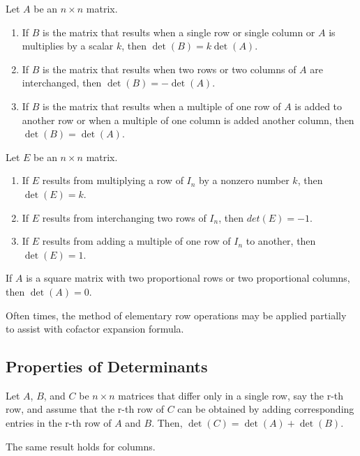 \documentclass{report}
\begin{document}
				\begin{thm}\label{thm_row_ops_det}
					Let $A$ be an $n \times n$ matrix.
					\begin{enumerate}
						\item If $B$ is the matrix that results when a single row or single column or $A$ is multiplies by a scalar $k$, then $\det(B)=k\det(A)$.
						\item If $B$ is the matrix that results when two rows or two columns of $A$ are interchanged, then $\det(B)=-\det(A)$.
						\item If $B$ is the matrix that results when a multiple of one row of $A$ is added to another row or when a multiple of one column is added another column, then $\det(B)=\det(A)$.
					\end{enumerate}
				\end{thm}
				
				\begin{coro}
					Let $E$ be an $n \times n$ matrix.
					\begin{enumerate}
						\item If $E$ results from multiplying a row of $I_n$ by a nonzero number $k$, then $\det(E)=k$.
						\item If $E$ results from interchanging two rows of $I_n$, then $det(E)=-1$.
						\item If $E$ results from adding a multiple of one row of $I_n$ to another, then $\det(E)=1$.
					\end{enumerate}
				\end{coro}
				
				\begin{thm}
					If $A$ is a square matrix with two proportional rows or two proportional columns, then $\det(A)=0$.
				\end{thm}
				
				Often times, the method of elementary row operations may be applied partially to assist with cofactor expansion formula.
			
		\subsection{Properties of Determinants}
			\begin{thm}
				Let $A$, $B$, and $C$ be $n \times n$ matrices that differ only in a single row, say the r-th row, and assume that the r-th row of $C$ can be obtained by adding corresponding entries in the r-th row of $A$ and $B$. Then, $\det(C)=\det(A)+\det(B)$.
				
				The same result holds for columns.
			\end{thm}
			
\end{document}
